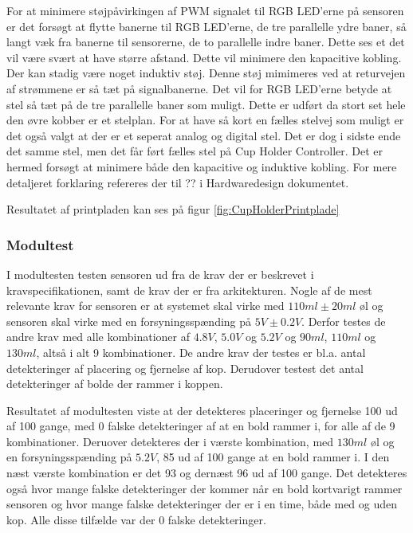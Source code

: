 \documentclass[Rapport/Rapport_main.tex]{subfiles}
\begin{document}
For at minimere støjpåvirkingen af PWM signalet til RGB LED'erne på sensoren er det forsøgt at flytte banerne til RGB LED'erne, de tre parallelle ydre baner, så langt væk fra banerne til sensorerne, de to parallelle indre baner. Dette ses et det vil være svært at have større afstand. Dette vil minimere den kapacitive kobling. Der kan stadig være noget induktiv støj. Denne støj mimimeres ved at returvejen af strømmene er så tæt på signalbanerne. Det vil for RGB LED'erne betyde at stel så tæt på de tre parallelle baner som muligt. Dette er udført da stort set hele den øvre kobber er et stelplan. For at have så kort en fælles stelvej som muligt er det også valgt at der er et seperat analog og digital stel. Det er dog i sidste ende det samme stel, men det får ført fælles stel på Cup Holder Controller.
Det er hermed forsøgt at minimere både den kapacitive og induktive kobling. For mere detaljeret forklaring refereres der til ?? i Hardwaredesign dokumentet.

Resultatet af printpladen kan ses på figur \ref{fig:CupHolderPrintplade}


\subsubsection{Modultest}
I modultesten testen sensoren ud fra de krav der er beskrevet i kravspecifikationen, samt de krav der er fra arkitekturen. Nogle af de mest relevante krav for sensoren er at systemet skal virke med $110\si{ml} \pm 20\si{ml}$ øl og sensoren skal virke med en forsyningsspænding på $5\si{V} \pm 0.2\si{V}$. Derfor testes de andre krav med alle kombinationer af $4.8\si{V}$, $5.0\si{V}$ og $5.2\si{V}$ og $90\si{ml}$, $110\si{ml}$ og $130\si{ml}$, altså i alt 9 kombinationer. De andre krav der testes er bl.a. antal detekteringer af placering og fjernelse af kop. Derudover testest det antal detekteringer af bolde der rammer i koppen.

Resultatet af modultesten viste at der detekteres placeringer og fjernelse 100 ud af 100 gange, med 0 falske detekteringer af at en bold rammer i, for alle af de 9 kombinationer. Deruover detekteres der i værste kombination, med $130\si{ml}$ øl og en forsyningsspænding på $5.2\si{V}$, 85 ud af 100 gange at en bold rammer i. I den næst værste kombination er det 93 og dernæst 96 ud af 100 gange. Det detekteres også hvor mange falske detekteringer der kommer når en bold kortvarigt rammer sensoren og hvor mange falske detekteringer der er i en time, både med og uden kop. Alle disse tilfælde var der 0 falske detekteringer.
\end{document}

